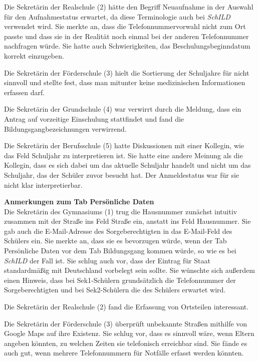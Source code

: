 Die Sekretärin der Realschule (2) hätte den Begriff \glqq Neuaufnahme\grqq{} in der Auswahl für den Aufnahmestatus erwartet, da diese Terminologie auch bei \glqq  \textit{SchILD} \grqq{} verwendet wird. Sie merkte an, dass die Telefonnummervorwahl nicht zum Ort passte und dass sie in der Realität noch einmal bei der anderen Telefonnummer nachfragen würde. Sie hatte auch Schwierigkeiten, das Beschulungsbeginndatum korrekt einzugeben.

Die Sekretärin der Förderschule (3) hielt die Sortierung der Schuljahre für nicht sinnvoll und stellte fest, dass man mitunter keine medizinischen Informationen erfassen darf.

Die Sekretärin der Grundschule (4) war verwirrt durch die Meldung, dass ein Antrag auf vorzeitige Einschulung stattfindet und fand die Bildungsgangbezeichnungen verwirrend.

Die Sekretärin der Berufsschule (5) hatte Diskussionen mit einer Kollegin, wie das Feld \glqq Schuljahr\grqq{} zu interpretieren ist. Sie hatte eine andere Meinung als die Kollegin, dass es sich dabei um das aktuelle Schuljahr handelt und nicht um das Schuljahr, das der Schüler zuvor besucht hat. Der Anmeldestatus war für sie nicht klar interpretierbar.

\textbf{Anmerkungen zum Tab \glqq Persönliche Daten\grqq{}}\\
Die Sekretärin des Gymnasiums (1) trug die Hausnummer zunächst intuitiv zusammen mit der Straße ins Feld \glqq Straße\grqq{} ein, anstatt ins Feld \glqq Hausnummer\grqq{}. Sie gab auch die E-Mail-Adresse des Sorgeberechtigten in das E-Mail-Feld des Schülers ein. Sie merkte an, dass sie es bevorzugen würde, wenn der Tab \glqq Persönliche Daten\grqq{} vor dem Tab \glqq Bildungsgang\grqq{} kommen würde, so wie es bei \glqq  \textit{SchILD} \grqq{} der Fall ist. Sie schlug auch vor, dass der Eintrag für \glqq Staat\grqq{} standardmäßig mit \glqq Deutschland\grqq{} vorbelegt sein sollte. Sie wünschte sich außerdem einen Hinweis, dass bei Sek1-Schülern grundsätzlich die Telefonnummer der Sorgeberechtigten und bei Sek2-Schülern die des Schülers erwartet wird.

Die Sekretärin der Realschule (2) fand die Erfassung von Ortsteilen interessant.

Die Sekretärin der Förderschule (3) überprüft unbekannte Straßen mithilfe von Google Maps auf ihre Existenz. Sie schlug vor, dass es sinnvoll wäre, wenn Eltern angeben könnten, zu welchen Zeiten sie telefonisch erreichbar sind. Sie fände es auch gut, wenn mehrere Telefonnummern für Notfälle erfasst werden könnten.

